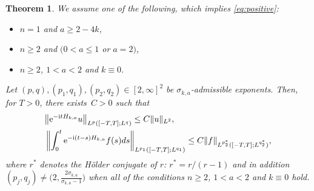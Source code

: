 \documentclass[pdftex]{sigma}
\numberwithin{equation}{section}
\newtheorem{Theorem}{Theorem}[section]
\def\s{\sigma}
\begin{document}
\begin{Theorem}\label{mainthmSt}
We assume one of the following, which implies \eqref{eq:positive}:
\begin{itemize}\itemsep=0pt
\item $n=1$ and $a\ge 2-4k$,
\item $n\ge 2$ and $(0<a\le 1$ or $a=2)$,
\item $n\ge 2$, $1<a<2$ and $k\equiv 0$.
\end{itemize}
Let $(p,q), (p_1,q_1), (p_2,q_2)\in [2,\infty]^2$ be $\sigma_{k,a}$-admissible exponents.
Then, for $T>0$, there exists~${C>0}$ such that
\begin{align}
&\big\|{\rm e}^{-{\rm i}tH_{k,a}}u\big\|_{L^p([-T,T]; L^q)}\leq C\|u\|_{L^2}\label{homStr},\\
&\left\|\int_{0}^t{\rm e}^{-{\rm i}(t-s)H_{k,a}}f(s)ds \right\|_{L^{p_1}([-T,T]; L^{q_1})} \leq C\|f\|_{L^{p_2^*}([-T,T]; L^{q_2^*})},\label{inhomStr}
\end{align}
where $r^*$ denotes the H\"older conjugate of $r$: $r^*=r/(r-1)$ and in addition $(p_j,q_j)\neq \bigl(2,\frac{2\s_{k,a}}{\s_{k,a}-1}\bigr)$ when all of the conditions $n\geq 2$, $1<a<2$ and $k\equiv 0$ hold.
\end{Theorem}
\end{document}
